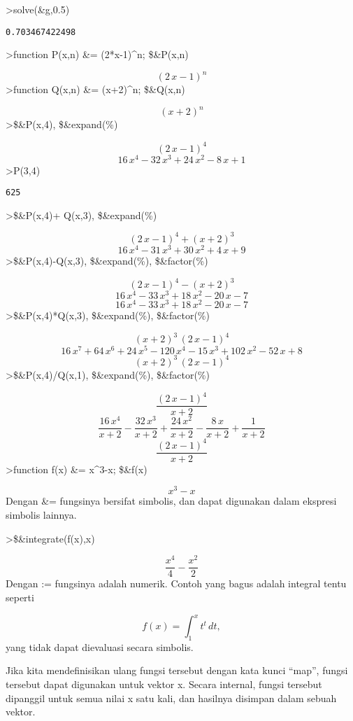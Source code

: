 \documentclass[
]{book}
\begin{document}
\textgreater solve(\&g,0.5)

\begin{verbatim}
0.703467422498
\end{verbatim}

\textgreater function P(x,n) \&= (2*x-1)\^{}n; \$\&P(x,n)

\[\left(2\,x-1\right)^{n}\]\textgreater function Q(x,n) \&= (x+2)\^{}n; \$\&Q(x,n)

\[\left(x+2\right)^{n}\]\textgreater\$\&P(x,4), \$\&expand(\%)

\[\left(2\,x-1\right)^4\] \[16\,x^4-32\,x^3+24\,x^2-8\,x+1\]\textgreater P(3,4)

\begin{verbatim}
625
\end{verbatim}

\textgreater\$\&P(x,4)+ Q(x,3), \$\&expand(\%)

\[\left(2\,x-1\right)^4+\left(x+2\right)^3\] \[16\,x^4-31\,x^3+30\,x^2+4\,x+9\]\textgreater\$\&P(x,4)-Q(x,3), \$\&expand(\%), \$\&factor(\%)

\[\left(2\,x-1\right)^4-\left(x+2\right)^3\] \[16\,x^4-33\,x^3+18\,x^2-20\,x-7\] \[16\,x^4-33\,x^3+18\,x^2-20\,x-7\]\textgreater\$\&P(x,4)*Q(x,3), \$\&expand(\%), \$\&factor(\%)

\[\left(x+2\right)^3\,\left(2\,x-1\right)^4\] \[16\,x^7+64\,x^6+24\,x^5-120\,x^4-15\,x^3+102\,x^2-52\,x+8\] \[\left(x+2\right)^3\,\left(2\,x-1\right)^4\]\textgreater\$\&P(x,4)/Q(x,1), \$\&expand(\%), \$\&factor(\%)

\[\frac{\left(2\,x-1\right)^4}{x+2}\] \[\frac{16\,x^4}{x+2}-\frac{32\,x^3}{x+2}+\frac{24\,x^2}{x+2}-\frac{8\,x}{x+2}+\frac{1}{x+2}\] \[\frac{\left(2\,x-1\right)^4}{x+2}\] \textgreater function f(x) \&= x\^{}3-x; \$\&f(x)

\[x^3-x\]Dengan \&= fungsinya bersifat simbolis, dan dapat digunakan dalam ekspresi simbolis lainnya.

\textgreater\$\&integrate(f(x),x)

\[\frac{x^4}{4}-\frac{x^2}{2}\]Dengan := fungsinya adalah numerik. Contoh yang bagus adalah integral tentu seperti

\[f(x) = \int_1^x t^t \, dt,\]yang tidak dapat dievaluasi secara simbolis.

Jika kita mendefinisikan ulang fungsi tersebut dengan kata kunci ``map'', fungsi tersebut dapat digunakan untuk vektor x. Secara internal, fungsi tersebut dipanggil untuk semua nilai x satu kali, dan hasilnya disimpan dalam sebuah vektor.
\end{document}
